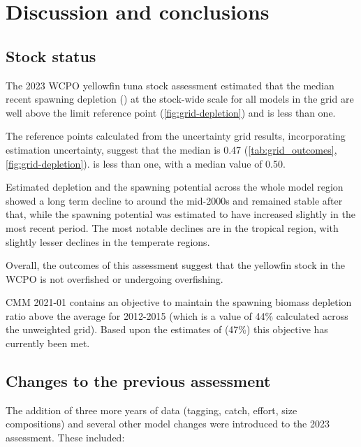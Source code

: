 
\section{Discussion and conclusions}
\label{sec:discussion}

\subsection{Stock status}

The 2023 WCPO yellowfin tuna stock assessment estimated that the median recent spawning depletion (\sbrsbfo) at the stock-wide scale for all models in the grid are well above the limit reference point (\autoref{fig:grid-depletion}) and \ffmsy is less than one.

The reference points calculated from the uncertainty grid results, incorporating estimation uncertainty, suggest that the median \sbrsbfo is 0.47 (\autoref{tab:grid_outcomes}, \autoref{fig:grid-depletion}). \ffmsy is less than one, with a median value of 0.50.

Estimated depletion and the spawning potential across the whole model region showed a long term decline to around the mid-2000s and remained stable after that, while the spawning potential was estimated to have increased slightly in the most recent period. The most notable declines are in the tropical region, with slightly lesser declines in the temperate regions.

Overall, the outcomes of this assessment suggest that the yellowfin stock in the WCPO is not overfished or undergoing overfishing.

CMM 2021-01 contains an objective to maintain the spawning biomass depletion ratio above the average \sbsbfo for 2012-2015 (which is a value of 44\% calculated across the unweighted grid). Based upon the estimates of \sbrsbfo (47\%\sbfo) this objective has currently been met.

\subsection{Changes to the previous assessment}
\label{sec:changes}

The addition of three more years of data (tagging, catch, effort, size compositions) and several other model changes were introduced to the 2023 assessment. These included:

